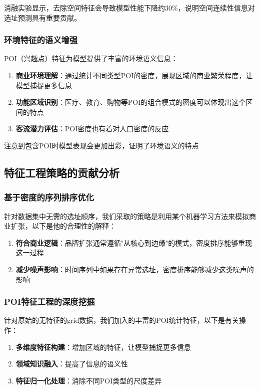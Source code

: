 \documentclass{article}
\begin{document}
消融实验显示，去除空间特征会导致模型性能下降约30\%，说明空间连续性信息对选址预测具有重要贡献。

\subsubsection{环境特征的语义增强}

POI（兴趣点）特征为模型提供了丰富的环境语义信息：

\begin{enumerate}
\item \textbf{商业环境理解}：通过统计不同类型POI的密度，展现区域的商业繁荣程度，让模型捕捉更多信息
\item \textbf{功能区域识别}：医疗、教育、购物等POI的组合模式的密度可以体现出这个区间的特点
\item \textbf{客流潜力评估}：POI密度也有着对人口密度的反应
\end{enumerate}

注意到包含POI时模型表现会更加出彩，证明了环境语义的特点

\subsection{特征工程策略的贡献分析}

\subsubsection{基于密度的序列排序优化}

针对数据集中无需的选址顺序，我们采取的策略是利用某个机器学习方法来模拟商业扩张，以下是他的合理性的解释：

\begin{enumerate}
\item \textbf{符合商业逻辑}：品牌扩张通常遵循"从核心到边缘"的模式，密度排序能够重现这一过程
\item \textbf{减少噪声影响}：时间序列中如果存在异常选址，密度排序能够减少这类噪声的影响
\end{enumerate}

\subsubsection{POI特征工程的深度挖掘}

针对原始的无特征的grid数据，我们加入的丰富的POI统计特征，以下是有关操作：

\begin{enumerate}
\item \textbf{多维度特征构建}：增加区域的特征，让模型捕捉更多信息
\item \textbf{领域知识融入}：提高了信息的语义性
\item \textbf{特征归一化处理}：消除不同POI类型的尺度差异
\end{enumerate}
\end{document}
